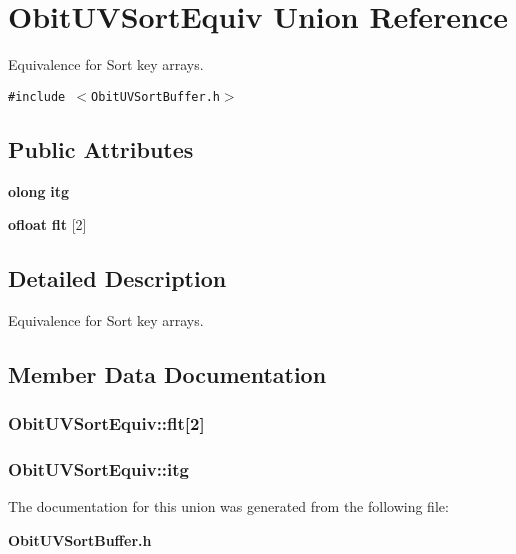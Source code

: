 \section{Obit\-UVSort\-Equiv Union Reference}
\label{unionObitUVSortEquiv}
Equivalence for Sort key arrays.  


{\tt \#include $<$Obit\-UVSort\-Buffer.h$>$}

\subsection*{Public Attributes}
\begin{CompactItemize}
\item 
{\bf olong} {\bf itg}
\item 
{\bf ofloat} {\bf flt} [2]
\end{CompactItemize}


\subsection{Detailed Description}
Equivalence for Sort key arrays. 



\subsection{Member Data Documentation}
\subsubsection{ {\bf Obit\-UVSort\-Equiv::flt}[2]}\label{unionObitUVSortEquiv_o1}


\subsubsection{ {\bf Obit\-UVSort\-Equiv::itg}}\label{unionObitUVSortEquiv_o0}




The documentation for this union was generated from the following file:\begin{CompactItemize}
\item 
{\bf Obit\-UVSort\-Buffer.h}\end{CompactItemize}
